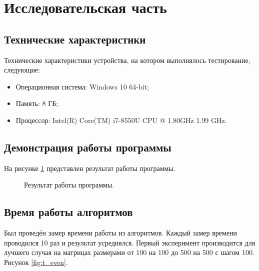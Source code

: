\section{Исследовательская часть}

\subsection{Технические характеристики}
Технические характеристики устройства, на котором выполнялось тестирование, следующие:
\begin{itemize}
    \item Операционная система: Windows 10 64-bit;
    \item Память: 8 ГБ;
    \item Процессор: Intel(R) Core(TM) i7-8550U CPU @ 1.80GHz   1.99 GHz.
\end{itemize}

\subsection{Демонстрация работы программы}
На рисунке \ref{fig:program} представлен результат работы программы.

\begin{figure}[H]
\caption{Результат работы программы.}
\label{fig:program}
\end{figure}

\newpage
\subsection{Время работы алгоритмов}

Был проведён замер времени работы из алгоритмов. Каждый замер времени проводился 10 раз и результат усреднялся. Первый эксперимент производится для лучшего случая на матрицах размерами от 100 на 100 до 500 на 500 с шагом 100. Рисунок \ref{fig:t_even}.

